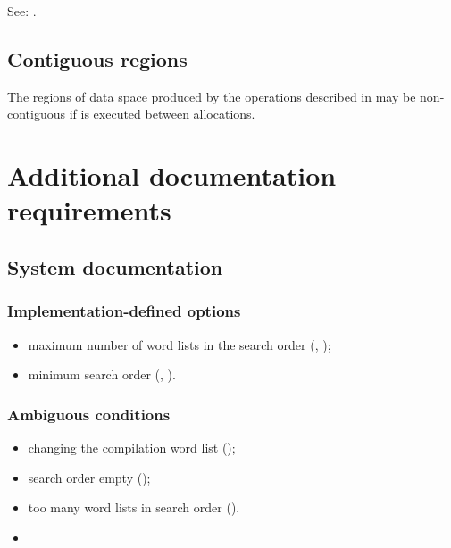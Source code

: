 See: .


\subsection{Contiguous regions} %

The regions of data space produced by the operations described in
 may be
non-contiguous if  is executed between allocations.

\section{Additional documentation requirements} %

\subsection{System documentation} %

\subsubsection{Implementation-defined options} %

\begin{itemize}
\item maximum number of word lists in the search order
	(,
	 );
\item minimum search order
	(,
	 ).
\end{itemize}

\subsubsection{Ambiguous conditions} %

\begin{itemize}
\item changing the compilation word list
	();
\item search order empty
	();
\item too many word lists in search order
	().
\item {}
\end{itemize}

